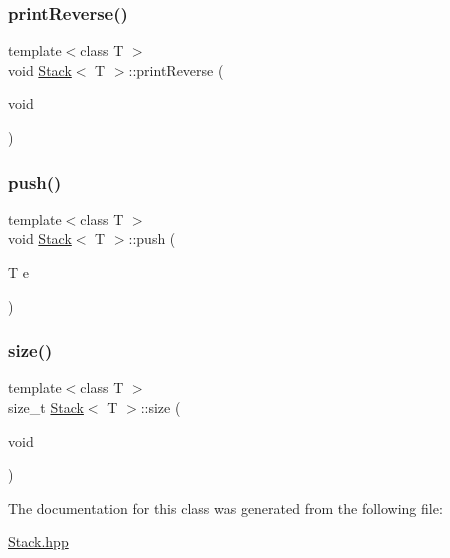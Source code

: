 \mbox{\label{class_stack_a81aeb2868a0e250e51af0bb015673672}} 
\subsubsection{\texorpdfstring{print\+Reverse()}{printReverse()}}
{\footnotesize\ttfamily template$<$class T $>$ \\
void \hyperlink{class_stack}{Stack}$<$ T $>$\+::print\+Reverse (\begin{DoxyParamCaption}\item[{void}]{ }\end{DoxyParamCaption})}

\mbox{\label{class_stack_ab9e4936dad73a983e9d8341c5a5c9da9}} 
\subsubsection{\texorpdfstring{push()}{push()}}
{\footnotesize\ttfamily template$<$class T $>$ \\
void \hyperlink{class_stack}{Stack}$<$ T $>$\+::push (\begin{DoxyParamCaption}\item[{T}]{e }\end{DoxyParamCaption})}

\mbox{\label{class_stack_a5e9a5b47dd8394a745da9c587e79586a}} 
\subsubsection{\texorpdfstring{size()}{size()}}
{\footnotesize\ttfamily template$<$class T $>$ \\
size\+\_\+t \hyperlink{class_stack}{Stack}$<$ T $>$\+::size (\begin{DoxyParamCaption}\item[{void}]{ }\end{DoxyParamCaption})}



The documentation for this class was generated from the following file\+:\begin{DoxyCompactItemize}
\item 
\hyperlink{_stack_8hpp}{Stack.\+hpp}\end{DoxyCompactItemize}

